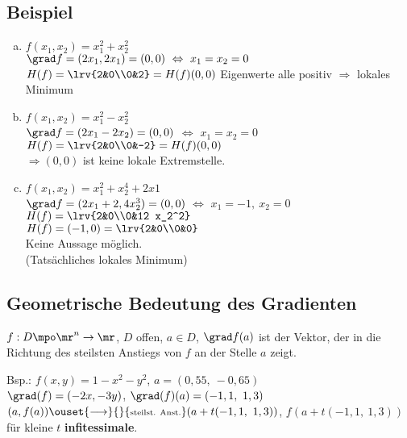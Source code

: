 \subsection{Beispiel}
	\begin{enumerate}[a)]
		\item $ f(x_1,x_2)=x_1^2+x_2^2 $\\
		$ \grad f=(2x_1,2x_1)=(0,0)\ \Leftrightarrow\ x_1=x_2=0 $\\
		$ H(f)=\lrv{2&0\\0&2}=H(f)(0,0) $ Eigenwerte alle positiv $ \Rightarrow $ lokales Minimum
		\item  $ f(x_1,x_2)=x_1^2-x_2^2 $\\
		$ \grad f=(2x_1-2x_2) =(0,0)$ $ \Leftrightarrow $ $ x_1=x_2=0 $\\
		$ H(f)=\lrv{2&0\\0&-2}=H(f)(0,0) $\\
		$ \Rightarrow (0,0) $ ist keine lokale Extremstelle.
		\item  $ f(x_1,x_2)=x_1^2+x_2^4+2x1 $\\
		$ \grad f=(2x_1+2,4x_2^3)=(0,0) $ $ \Leftrightarrow $ $ x_1=-1,\ x_2=0 $\\
		$ H(f)=\lrv{2&0\\0&12 x_2^2} $\\
		$ H(f)=(-1,0)=\lrv{2&0\\0&0} $\\
		Keine Aussage möglich.\\
		(Tatsächliches lokales Minimum)
	\end{enumerate}

\subsection{Geometrische Bedeutung des Gradienten}
	$ f:D\mpo\mr^n\rightarrow\mr $, $ D $ offen, $ a\in D $, $ \grad f(a)$ ist der Vektor, der in die Richtung des steilsten Anstiegs von $ f $ an der Stelle $ a $ zeigt.
	
	Bsp.: $ f(x,y)=1-x^2-y^2 $, $ a=(0,55,\ -0,65) $\\
	$ \grad(f)=(-2x,-3y) $, $ \grad(f)(a)=(-1,1,\ 1,3) $\\
	$ (a,f(a))\ouset{\longrightarrow}{}{\mbox{\scriptsize steilst. Anst.}} (a+t(-1,1,\ 1,3)) $, $ f(a+t(-1,1,\ 1,3)) $ für kleine $ t $ \textbf{infitessimale}.